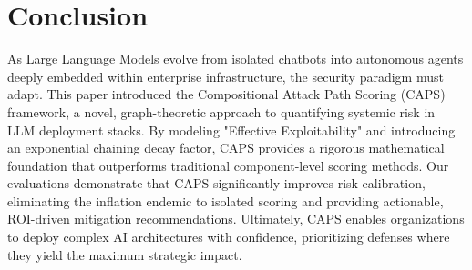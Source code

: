 \section{Conclusion}
\label{sec:conclusion}

As Large Language Models evolve from isolated chatbots into autonomous agents deeply embedded within enterprise infrastructure, the security paradigm must adapt. This paper introduced the Compositional Attack Path Scoring (CAPS) framework, a novel, graph-theoretic approach to quantifying systemic risk in LLM deployment stacks. By modeling "Effective Exploitability" and introducing an exponential chaining decay factor, CAPS provides a rigorous mathematical foundation that outperforms traditional component-level scoring methods. Our evaluations demonstrate that CAPS significantly improves risk calibration, eliminating the inflation endemic to isolated scoring and providing actionable, ROI-driven mitigation recommendations. Ultimately, CAPS enables organizations to deploy complex AI architectures with confidence, prioritizing defenses where they yield the maximum strategic impact.

